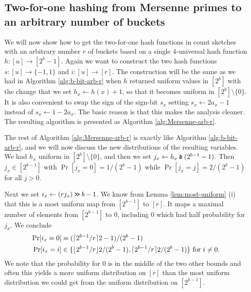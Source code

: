 \subsection{Two-for-one hashing from Mersenne primes to an arbitrary number of buckets}
We will now show how to get the two-for-one hash functions in count sketches with an arbitrary number $r$ of buckets based on a single $4$-universal hash function $h:[u]\to [2^b-1]$.
Again we want to construct the two hash functions $s:[u]\to\{-1,1\}$ and $i:[u]\to[r]$.
The construction will be the same as we had in Algorithm \ref{alg:b-bit-arb-r} when $h$ returned uniform values in $[2^b]$ with the change that we set $h_x\gets h(x)+1$, so that it becomes uniform in $[2^b]\setminus\{0\}$.
It is also convenient to swap the sign of the sign-bit $s_x$ setting $s_x\gets 2a_x - 1$ instead of $s_x\gets 1-2a_x$.
The basic reason is that this makes the analysis cleaner.
The resulting algorithm is presented as Algorithm \ref{alg:Mersenne-arb-r}.
The rest of Algorithm \ref{alg:Mersenne-arb-r} is exactly like Algorithm \ref{alg:b-bit-arb-r}, and we will now discuss the new distributions of the resulting variables.
We had $h_x$ uniform in $[2^b]\setminus\{0\}$, and then we set $j_x \gets h_x\mathbin{\texttt{\&}}(2^{b-1}-1)$.
Then $j_x\in[2^{b-1}]$ with $\Pr[j_x=0]=1/(2^{b}-1)$ while  $\Pr[j_x=j]=2/(2^{b}-1)$ for all $j>0$.

Next we set $i_x\gets (rj_x)\mathbin{\texttt{>\!>}} b-1$.
We know from Lemma \ref{lem:most-uniform} (i) that this is a most uniform map from $[2^{b-1}]$ to $[r]$.
It maps a maximal number of elements from $[2^{b-1}]$ to $0$, including $0$ which had half probability for $j_x$.
We conclude
\begin{align}
   \Pr[i_x=0] & = (\lceil {2^{b-1}/r}\rceil2-1)/(2^{b}-1) \label{eq:prix0} \\ \Pr[i_x = i] & \in \{\lfloor {2^{b-1}/r} \rfloor2/(2^{b}-1), \lceil {2^{b-1}/r}\rceil2/(2^{b}-1)\} \mbox{ for $i \neq  0$} \label{eq:prixneq0} .
\end{align}
We note that the probability for $0$ is in the middle of the two other bounds and often this yields a more uniform distribution on $[r]$ than the most uniform distribution we could get from the uniform distribution on $[2^{b-1}]$.

